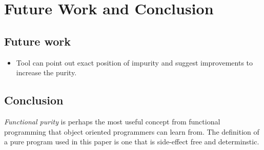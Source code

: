 \documentclass[a4paper,12pt]{article}
\begin{document}
\section{Future Work and Conclusion} \label{sec:Conclusion and future Work}
\subsection{Future work} \label{sub:Future work}

\begin{itemize}
  \item Tool can point out exact position of impurity and suggest improvements to increase the purity.
\end{itemize}

\subsection{Conclusion} \label{sub:Conclusion}
\textit{Functional purity} is perhaps the most useful concept from functional programming that object oriented programmers can learn from. The definition of a pure program used in this paper is one that is side-effect free and determinstic.



\end{document}
